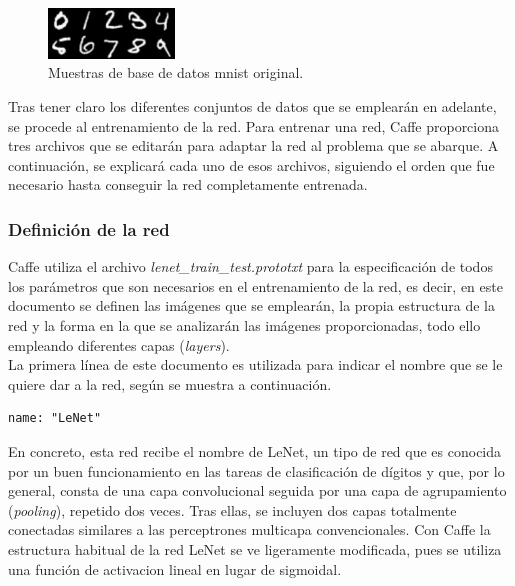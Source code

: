 \begin{figure}[H]
	\begin{center}
		\includegraphics[width=0.3\textwidth]{figures/original}
		\caption{Muestras de base de datos \acrshort{mnist} original.}
		\label{fig.digitosMNIST}
	\end{center}
\end{figure}

Tras tener claro los diferentes conjuntos de datos que se emplearán en adelante, se procede al entrenamiento de la red. Para entrenar una red, Caffe proporciona tres archivos que se editarán para adaptar la red al problema que se abarque. A continuación, se explicará cada uno de esos archivos, siguiendo el orden que fue necesario hasta conseguir la red completamente entrenada.\\

\subsubsection{Definición de la red}
	Caffe utiliza el archivo 
	\textit{lenet\_train\_test.prototxt} para la especificación de todos los parámetros que son necesarios en el entrenamiento de la red, es decir, en este documento se definen las imágenes que se emplearán, la propia estructura de la red y la forma en la que se analizarán las imágenes proporcionadas, todo ello empleando diferentes capas (\textit{layers}).\\

	La primera línea de este documento es utilizada para indicar el nombre que se le quiere dar a la red, según se muestra a continuación.
	\vspace{10pt}
	\begin{lstlisting}[frame=single]
	name: "LeNet"
	\end{lstlisting}
	
	En concreto, esta red recibe el nombre de LeNet, un tipo de red que es conocida por un buen funcionamiento en las tareas de clasificación de dígitos y que, por lo general, consta de una capa convolucional seguida por una capa de agrupamiento (\textit{pooling}), repetido dos veces. Tras ellas, se incluyen dos capas totalmente conectadas similares a las perceptrones multicapa convencionales. Con Caffe la estructura habitual de la red LeNet se ve ligeramente modificada, pues se utiliza una función de activacion lineal en lugar de sigmoidal.\\

